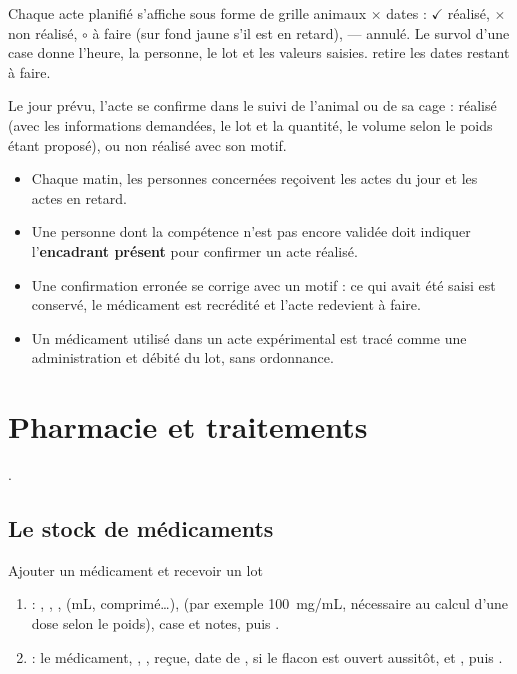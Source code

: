 \documentclass[11pt,a4paper]{article}
\begin{document}
Chaque acte planifié s'affiche sous forme de grille animaux × dates :
$\checkmark$ réalisé, $\times$ non réalisé, $\circ$ à faire (sur fond jaune
s'il est en retard), --- annulé. Le survol d'une case donne l'heure, la
personne, le lot et les valeurs saisies.  retire les dates
restant à faire.

Le jour prévu, l'acte se confirme dans le suivi de l'animal ou de sa cage :
réalisé (avec les informations demandées, le lot et la quantité, le volume
selon le poids étant proposé), ou non réalisé avec son motif.
\begin{regle}
\begin{itemize}
  \item Chaque matin, les personnes concernées reçoivent les actes du jour et
    les actes en retard.
  \item Une personne dont la compétence n'est pas encore validée doit
    indiquer l'\textbf{encadrant présent} pour confirmer un acte réalisé.
  \item Une confirmation erronée se corrige avec un motif : ce qui avait été
    saisi est conservé, le médicament est recrédité et l'acte redevient à
    faire.
  \item Un médicament utilisé dans un acte expérimental est tracé comme une
    administration et débité du lot, sans ordonnance.
\end{itemize}
\end{regle}

\section{Pharmacie et traitements}\label{sec:pharmacie}
.

\subsection{Le stock de médicaments}
\begin{procedure}{Ajouter un médicament et recevoir un lot}
\begin{enumerate}
  \item {} : , ,
    ,  (mL, comprimé…),
     (par exemple 100~mg/mL, nécessaire au calcul d'une
    dose selon le poids), case  et notes, puis .
  \item {} : le médicament, ,
    ,  reçue, date de ,
     si le flacon est ouvert aussitôt,
     et , puis .
\end{enumerate}
\end{procedure}
\end{document}
